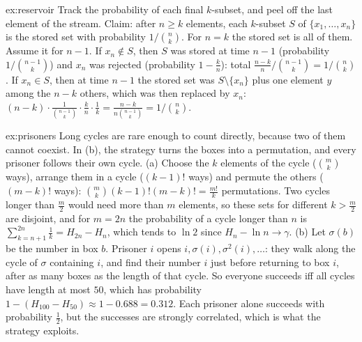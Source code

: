 \begin{solution}{ex:reservoir}
\idea Track the probability of each final $k$-subset, and peel off the last element of the stream.
\writeup Claim: after $n\ge k$ elements, each $k$-subset $S$ of $\{x_1,\dots,x_n\}$ is the stored set with probability
$1/\binom nk$. For $n=k$ the stored set is all of them. Assume it for $n-1$. If $x_n\notin S$, then $S$ was stored at time
$n-1$ (probability $1/\binom{n-1}k$) and $x_n$ was rejected (probability $1-\frac kn$): total $\frac{n-k}n/\binom{n-1}k=1/\binom nk$. If
$x_n\in S$, then at time $n-1$ the stored set was $S\setminus\{x_n\}$ plus one element $y$ among the $n-k$ others, which
was then replaced by $x_n$: $(n-k)\cdot\frac1{\binom{n-1}k}\cdot\frac kn\cdot\frac1k=\frac{n-k}{n\binom{n-1}k}=1/\binom nk$.
\end{solution}

\begin{solution}{ex:prisoners}
\idea Long cycles are rare enough to count directly, because two of them cannot coexist. In (b), the strategy
turns the boxes into a permutation, and every prisoner follows their own cycle.
\writeup (a) Choose the $k$ elements of the cycle ($\binom mk$ ways), arrange them in a cycle ($(k-1)!$ ways) and permute
the others ($(m-k)!$ ways): $\binom mk(k-1)!(m-k)!=\frac{m!}k$ permutations. Two cycles longer than $\frac m2$ would need more
than $m$ elements, so these sets for different $k>\frac m2$ are disjoint, and for $m=2n$ the probability of a cycle
longer than $n$ is $\sum_{k=n+1}^{2n}\frac1k=H_{2n}-H_n$, which tends to $\ln2$ since $H_n-\ln n\to\gamma$.
(b) Let $\sigma(b)$ be the number in box $b$. Prisoner $i$ opens $i,\sigma(i),\sigma^2(i),\dots$: they walk along the cycle of
$\sigma$ containing $i$, and find their number $i$ just before returning to box $i$, after as many boxes as the length of
that cycle. So everyone succeeds iff all cycles have length at most $50$, which has probability
$1-(H_{100}-H_{50})\approx1-0.688=0.312$. Each prisoner alone succeeds with probability $\frac12$, but the successes are
strongly correlated, which is what the strategy exploits.
\end{solution}

